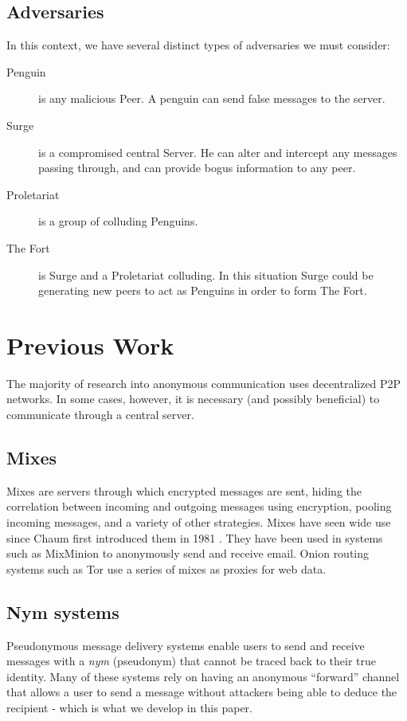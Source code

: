 \documentclass[twocolumn,11pt,english]{article}
\begin{document}
\subsection{Adversaries}
In this context, we have several distinct types of adversaries we must consider:
\begin{description}
\item[Penguin] 
  is any malicious Peer. A penguin can send false messages to the server. 
\item[Surge] 
  is a compromised central Server. He can alter and intercept any messages passing through, and can provide bogus information to any peer.
\item[Proletariat] 
  is a group of colluding Penguins.
\item[The Fort] 
  is Surge and a Proletariat colluding. In this situation Surge could be generating new peers to act as Penguins in order to form The Fort.
\end{description}

\section{Previous Work}
The majority of research into anonymous communication uses decentralized P2P networks. In some cases, however, it is necessary (and possibly beneficial) to communicate through a central server. 

\subsection{Mixes}
Mixes are servers through which encrypted messages are sent, hiding the correlation between incoming and outgoing messages using encryption, pooling incoming messages, and a variety of other strategies. Mixes have seen wide use since Chaum first introduced them in 1981 \cite{chaum-mix}. They have been used in systems such as MixMinion\cite{minion-design} to anonymously send and receive email. Onion routing systems such as Tor \cite{tor-design} use a series of mixes as proxies for web data. 

\subsection{Nym systems} Pseudonymous message delivery systems enable users to send and receive messages with a \textit{nym} (pseudonym) that cannot be traced back to their true identity. Many of these systems rely on having an anonymous ``forward'' channel that allows a user to send a message without attackers being able to deduce the recipient - which is what we develop in this paper. 
\end{document}

